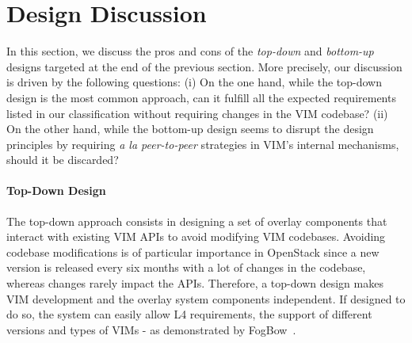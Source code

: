 
\section{Design Discussion}
\label{sec:design_discussion}

In this section, we discuss the pros and cons of the \emph{top-down} and
\emph{bottom-up} designs targeted at the end of the previous section.
More precisely, our discussion is driven by the following questions: (i) On the
one hand, while the top-down design is the most common approach, can it fulfill
all the expected requirements listed in our classification without requiring
changes in the VIM codebase? (ii) On the other hand, while the bottom-up design
seems to disrupt the design principles by requiring \emph{a la peer-to-peer}
strategies in VIM's internal mechanisms, should it be discarded?

\paragraph{Top-Down Design}
The top-down approach consists in designing a set of overlay components that
interact with existing VIM APIs to avoid modifying VIM codebases.
Avoiding codebase modifications is of particular importance in OpenStack since
a new version is released every six months with a lot of changes in the
codebase, whereas changes rarely impact the APIs. Therefore, a top-down design
makes VIM development and the overlay system components independent. If
designed to do so, the system can easily allow L4 requirements, \ie the
support of different versions and types of VIMs - as demonstrated by 
FogBow~\cite{brasileiro2016fogbow}.

